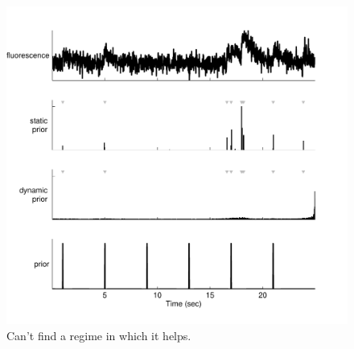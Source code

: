 
\begin{figure}[h!]
\centering \includegraphics[width=.9\linewidth]{../figs/dynamic_prior}
\caption{Can't find a regime in which it helps.} \label{fig:woopsi}
\end{figure}